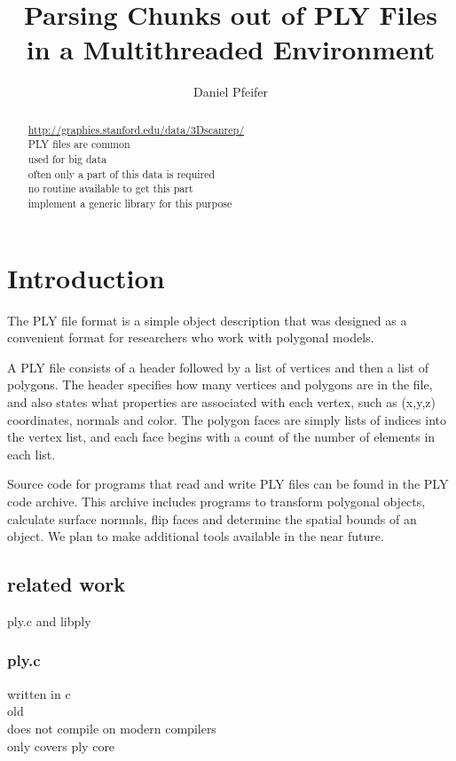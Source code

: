 \documentclass[a4paper,parskip=half]{scrartcl}
\title{Parsing Chunks out of PLY Files\\in a Multithreaded Environment}
\author{Daniel Pfeifer}
\begin{document}
%
\maketitle
%
\begin{abstract}
\url{http://graphics.stanford.edu/data/3Dscanrep/}\\
PLY files are common\\
used for big data\\
often only a part of this data is required\\
no routine available to get this part\\
implement a generic library for this purpose\\
\end{abstract}
%
\section{Introduction}
The PLY file format is a simple object description that was designed as a
convenient format for researchers who work with polygonal models.

A PLY file consists of a header followed by a list of vertices and then a list of
polygons. The header specifies how many vertices and polygons are in the file,
and also states what properties are associated with each vertex, such as (x,y,z)
coordinates, normals and color. The polygon faces are simply lists of indices
into the vertex list, and each face begins with a count of the number of elements
in each list.

Source code for programs that read and write PLY files can be found in the PLY
code archive. This archive includes programs to transform polygonal objects,
calculate surface normals, flip faces and determine the spatial bounds of an
object. We plan to make additional tools available in the near future.

\subsection{related work}
%
ply.c and libply

\subsubsection{ply.c}
written in c\\
old\\
does not compile on modern compilers\\
only covers ply core\\
\end{document}
